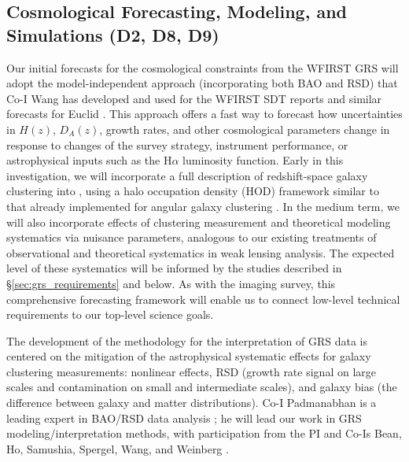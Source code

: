 

\subsection{Cosmological Forecasting, Modeling, and Simulations (D2, D8, D9)}
\label{sec:cmethods}

 Our initial forecasts for the cosmological constraints from 
the WFIRST GRS will adopt the model-independent approach (incorporating
both BAO and RSD) that Co-I Wang has developed \cite{Wang2013} and
used for the WFIRST SDT reports and similar forecasts for Euclid \cite{WangEuclid2010}.
This approach offers a fast way to forecast how uncertainties in
$H(z)$, $D_A(z)$, growth rates, and other cosmological parameters
change in response to changes of the survey strategy, instrument
performance, or astrophysical inputs such as the H$\alpha$ luminosity
function.  Early in this investigation, we will incorporate a full description
of redshift-space galaxy clustering into \CoLi, using a halo
occupation density (HOD) framework similar to that already implemented for 
angular galaxy clustering \cite{Krause2013}.  In the medium term, we will also
incorporate effects of clustering measurement and theoretical
modeling systematics via nuisance parameters, analogous to our
existing treatments of observational and theoretical systematics
in weak lensing analysis.  The expected level of these systematics
will be informed by the studies described in \S\ref{sec:grs_requirements}
and below.  As with the imaging survey, this comprehensive forecasting
framework will enable us to connect low-level technical requirements
to our top-level science goals.

 The development of the methodology for the
interpretation of GRS data is centered on the mitigation of the
astrophysical systematic effects  for galaxy clustering measurements:
nonlinear effects, RSD (growth rate signal on large scales and
contamination on small and intermediate scales),  and galaxy bias (the
difference between galaxy and matter distributions). 
Co-I Padmanabhan is a leading expert in BAO/RSD data analysis \cite{Padmanabhan2007,Padmanabhan2008,Padmanabhan2009,Padmanabhan2012,Xu2012}; he will lead our
work in GRS modeling/interpretation methods, with participation from the PI and Co-Is
Bean, Ho, Samushia, Spergel, Wang, and Weinberg \cite{CW12,Ho2012,Anderson2014,Wang2014,Osumi2015,Alam2015a,Alam2015b,Cuesta2015}.

